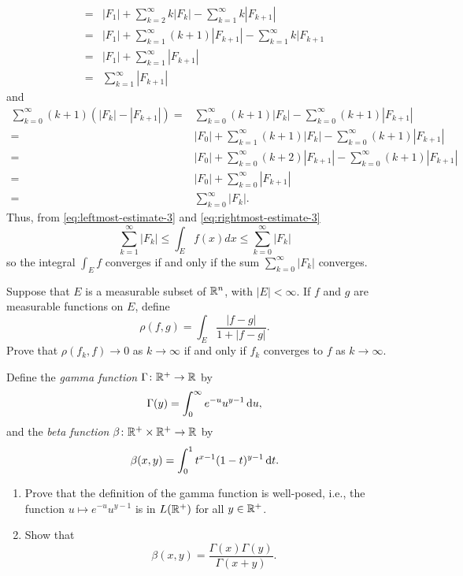 \begin{solution}
\begin{equation}
\begin{aligned}
={}&|F_1|+\sum_{k=2}^\infty k|F_k|-\sum_{k=1}^\infty k|F_{k+1}|\\
={}&|F_1|+\sum_{k=1}^\infty(k+1)|F_{k+1}|-\sum_{k=1}^\infty k|F_{k+1}\\
={}&|F_1|+\sum_{k=1}^\infty |F_{k+1}|\\
={}&\sum_{k=1}^\infty|F_{k+1}|
\end{aligned}
\end{equation}
and
\begin{equation}
\label{eq:rightmost-estimate-3}
\begin{aligned}
\sum_{k=0}^\infty(k+1)\left(|F_k|-|F_{k+1}|\right)
={}&\sum_{k=0}^\infty(k+1)|F_k|-\sum_{k=0}^\infty(k+1)|F_{k+1}|\\
={}&|F_0|+\sum_{k=1}^\infty(k+1)|F_k|-\sum_{k=0}^\infty(k+1)|F_{k+1}|\\
={}&|F_0|+\sum_{k=0}^\infty(k+2)|F_{k+1}|-\sum_{k=0}^\infty(k+1)|F_{k+1}|\\
={}&|F_0|+\sum_{k=0}^\infty|F_{k+1}|\\
={}&\sum_{k=0}^\infty|F_k|.
\end{aligned}
\end{equation}
Thus, from \eqref{eq:leftmost-estimate-3} and
\eqref{eq:rightmost-estimate-3}
\begin{equation}
\label{eq:final-upper-lower-estimates-3}
\sum_{k=1}^\infty|F_k|\leq\int_E f( x ) d  x \leq\sum_{k=0}^\infty|F_k|
\end{equation}
so the integral $\int_E f$ converges if and only if the sum
$\sum_{k=0}^\infty|F_k|$ converges.
\end{solution}
\begin{problem}
Suppose that $E$ is a measurable subset of $\mathbb{R}^n$, with
$|E|<\infty$. If $f$ and $g$ are measurable functions on
$E$, define
\[
\rho(f,g)=\int_E\frac{|f-g|}{1+|f-g|}.
\]
Prove that $\rho(f_k,f)\to 0$ as $k\to\infty$ if and only if $f_k$
converges to $f$ as $k\to\infty$.
\end{problem}
\begin{solution}
\end{solution}

\begin{problem}
Define the \emph{gamma function} $\Gamma\colon\mathbb{R}^+\to\mathbb{R}$ by
\[
\Gamma(y)=\int_0^\infty e^{-u}u^{y-1}\mathop{}\!\mathrm{d} u,
\]
and the \emph{beta function} $\beta\colon\mathbb{R}^+\times\mathbb{R}^+\to\mathbb{R}$
by
\[
\beta(x,y)=\int_0^1 t^{x-1}(1-t)^{y-1}\mathop{}\!\mathrm{d} t.
\]
\begin{enumerate}[label=(\alph*),noitemsep]
\item Prove that the definition of the gamma function is well-posed, i.e.,
the function $u\mapsto e^{-u}u^{y-1}$ is in $L(\mathbb{R}^+)$ for all
$y\in\mathbb{R}^+$.
\item Show that
\[
\beta(x,y)=\frac{\Gamma(x)\Gamma(y)}{\Gamma(x+y)}.
\]
\end{enumerate}
\end{problem}
\begin{solution}
\end{solution}

